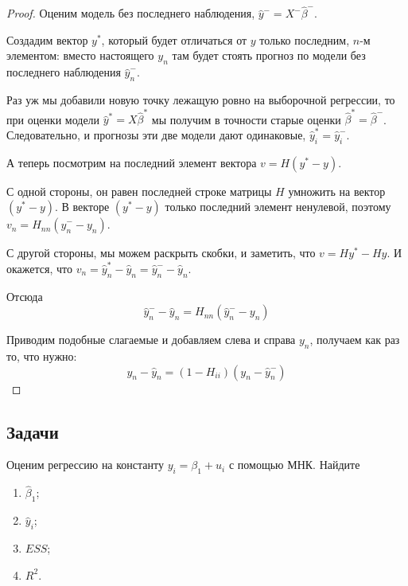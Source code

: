 \documentclass[12pt]{article}
\newcommand{\hb}{\hat{\beta}}
\newcommand{\hy}{\hat{y}}
\newcommand{\ESS}{ESS}
\begin{document}
\begin{proof}
Оценим модель без последнего наблюдения, $\hat y^{-} = X^{-} \hb^{-}$. 

Создадим вектор $y^{*}$, который будет отличаться от $y$ только последним, $n$-м элементом:
вместо настоящего $y_n$ там будет стоять прогноз по модели без последнего наблюдения $\hat y^{-}_n$.

Раз уж мы добавили новую точку лежащую ровно на выборочной регрессии, то при оценки модели
$\hat y^* = X \hat \beta^*$ мы получим в точности старые оценки $\hat \beta^* = \hat \beta^-$. 
Следовательно, и прогнозы эти две модели дают одинаковые, $\hat y_i^* = \hat y_i^-$.

А теперь посмотрим на последний элемент вектора $v = H (y^* - y)$.

С одной стороны, он равен последней строке матрицы $H$ умножить на вектор $(y^* - y)$. 
В векторе $(y^* - y)$ только последний элемент ненулевой, поэтому $v_n = H_{nn} (\hat y^{-}_n - y_n)$.

С другой стороны, мы можем раскрыть скобки, и заметить, что $v = Hy^* - Hy$. 
И окажется, что $v_n = \hat y_n^* - \hat y_n = \hat y_n^- - \hat y_n$.

Отсюда
\[
 \hat y_n^- - \hat y_n = H_{nn} (\hat y_n^- - y_n)
\]

Приводим подобные слагаемые и добавляем слева и справа $y_n$, получаем как раз то, что нужно:
\[
y_n - \hat y_n   = (1 - H_{ii}) (y_n - \hat y_n^- )
\]
\end{proof}


\subsection{Задачи}


\begin{problem}
    Оценим  регрессию на константу $y_i = \beta_1 + u_i$ с помощью МНК. 
    Найдите
    \begin{enumerate}
        \item $\hb_1$;
        \item $\hy_i$;
        \item $\ESS$;
        \item $R^2$.
    \end{enumerate}
\end{problem}
\end{document}
